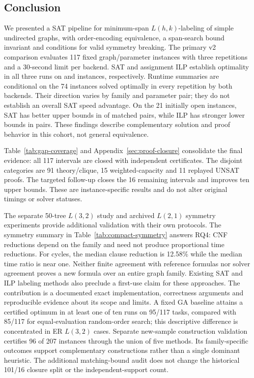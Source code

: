 \subsection{Conclusion}
We presented a SAT pipeline for minimum-span $L(h,k)$-labeling of simple
undirected graphs, with order-encoding equivalence, a span-search bound
invariant and conditions for valid symmetry breaking. The primary v2
comparison evaluates 117 fixed graph/parameter instances with three
repetitions and a 30-second limit per backend. SAT and assignment ILP
establish optimality in all three runs on \ProgressSATStable{} and
\ProgressILPStable{} instances, respectively. Runtime summaries are
conditional on the 74 instances solved optimally in every repetition by
both backends. Their direction varies by family and parameter pair;
they do not establish an overall SAT speed advantage.
On the 21 initially open
instances, SAT has better upper bounds in \ProgressOpenSATUB{} of
\ProgressOpenPairs{} matched pairs, while ILP has stronger lower bounds
in \ProgressOpenILPLB{} pairs. These findings describe complementary
solution and proof behavior in this cohort, not general equivalence.

Table~\ref{tab:gap-coverage} and Appendix~\ref{sec:proof-closure}
consolidate the final evidence: all 117 intervals are closed with
independent certificates. The disjoint categories are 91 theory/clique,
15 weighted-capacity and 11 replayed UNSAT proofs. The targeted follow-up
closes the 16 remaining intervals and improves ten upper bounds.
These are instance-specific results and do not alter original timings
or solver statuses.

The separate 50-tree $L(3,2)$ study and archived $L(2,1)$ symmetry
experiments provide additional validation with their own protocols.
The symmetry summary in Table~\ref{tab:compact-symmetry} answers RQ4:
CNF reductions depend on the family and need not produce proportional
time reductions. For cycles, the median clause reduction is 12.58\%
while the median time ratio is near one.
Neither finite agreement with reference formulas nor solver agreement
proves a new formula over an entire graph family. Existing SAT and ILP
labeling methods also preclude a first-use claim for these approaches.
The contribution is a documented exact implementation, correctness
arguments and reproducible evidence about its scope and limits. A fixed GA
baseline attains a certified optimum in at least one of ten runs on 95/117
tasks, compared with 85/117 for equal-evaluation random-order search; this
descriptive difference is concentrated in ER $L(3,2)$ cases.
Separate new-sample construction validation certifies 96 of 207 instances
through the union of five methods. Its family-specific outcomes support
complementary constructions rather than a single dominant heuristic.
The additional matching-bound audit does not change the historical
101/16 closure split or the independent-support count.

